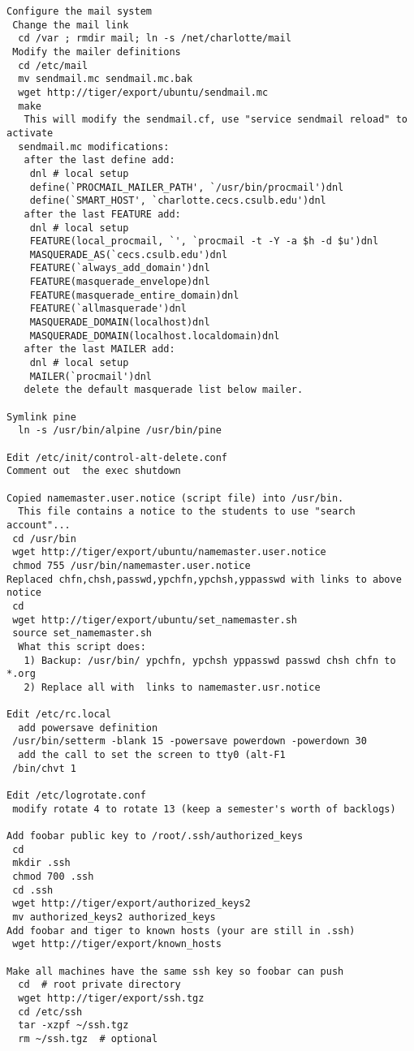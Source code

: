 \begin{verbatim}
Configure the mail system
 Change the mail link
  cd /var ; rmdir mail; ln -s /net/charlotte/mail
 Modify the mailer definitions
  cd /etc/mail 
  mv sendmail.mc sendmail.mc.bak
  wget http://tiger/export/ubuntu/sendmail.mc
  make
   This will modify the sendmail.cf, use "service sendmail reload" to activate
  sendmail.mc modifications:
   after the last define add:
    dnl # local setup
    define(`PROCMAIL_MAILER_PATH', `/usr/bin/procmail')dnl
    define(`SMART_HOST', `charlotte.cecs.csulb.edu')dnl
   after the last FEATURE add:
    dnl # local setup
    FEATURE(local_procmail, `', `procmail -t -Y -a $h -d $u')dnl
    MASQUERADE_AS(`cecs.csulb.edu')dnl
    FEATURE(`always_add_domain')dnl
    FEATURE(masquerade_envelope)dnl
    FEATURE(masquerade_entire_domain)dnl
    FEATURE(`allmasquerade')dnl
    MASQUERADE_DOMAIN(localhost)dnl
    MASQUERADE_DOMAIN(localhost.localdomain)dnl
   after the last MAILER add:
    dnl # local setup
    MAILER(`procmail')dnl
   delete the default masquerade list below mailer.

Symlink pine
  ln -s /usr/bin/alpine /usr/bin/pine

Edit /etc/init/control-alt-delete.conf
Comment out  the exec shutdown

Copied namemaster.user.notice (script file) into /usr/bin.
  This file contains a notice to the students to use "search account"...
 cd /usr/bin
 wget http://tiger/export/ubuntu/namemaster.user.notice
 chmod 755 /usr/bin/namemaster.user.notice
Replaced chfn,chsh,passwd,ypchfn,ypchsh,yppasswd with links to above notice
 cd
 wget http://tiger/export/ubuntu/set_namemaster.sh
 source set_namemaster.sh
  What this script does:
   1) Backup: /usr/bin/ ypchfn, ypchsh yppasswd passwd chsh chfn to *.org
   2) Replace all with  links to namemaster.usr.notice

Edit /etc/rc.local
  add powersave definition
 /usr/bin/setterm -blank 15 -powersave powerdown -powerdown 30
  add the call to set the screen to tty0 (alt-F1
 /bin/chvt 1

Edit /etc/logrotate.conf
 modify rotate 4 to rotate 13 (keep a semester's worth of backlogs)

Add foobar public key to /root/.ssh/authorized_keys
 cd
 mkdir .ssh
 chmod 700 .ssh
 cd .ssh
 wget http://tiger/export/authorized_keys2
 mv authorized_keys2 authorized_keys
Add foobar and tiger to known hosts (your are still in .ssh)
 wget http://tiger/export/known_hosts

Make all machines have the same ssh key so foobar can push
  cd  # root private directory
  wget http://tiger/export/ssh.tgz
  cd /etc/ssh
  tar -xzpf ~/ssh.tgz
  rm ~/ssh.tgz  # optional


\end{verbatim}
